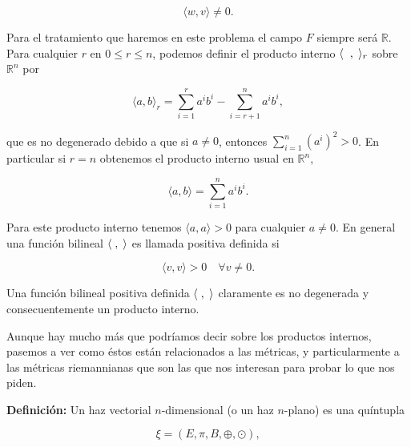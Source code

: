 \documentclass[a4paper,10pt]{article}
\numberwithin{equation}{section}
\newcommand{\definicion}{\textbf{Definición: }}
\begin{document}
\begin{equation}
 \langle w, v \rangle \ne 0.
\end{equation}

Para el tratamiento que haremos en este problema el campo $F$ siempre será $\mathbb{R}$. Para 
cualquier $r$ en $0 \leq r \leq n$, podemos definir el producto interno 
$\langle \hspace{.2cm} , \hspace{.1cm} \rangle_r$ sobre $\mathbb{R}^n$ por 

\begin{equation}
 \langle a, b \rangle_r = \sum_{i=1}^r a^ib^i - \sum_{i=r+1}^n a^ib^i,
\end{equation}

que es no degenerado debido a que si $a \ne 0$, entonces $\sum_{i=1}^n (a^i)^2 > 0$. 
En particular si $r = n$ obtenemos el producto interno usual en $\mathbb{R}^n$,

\begin{equation}
 \langle a, b \rangle = \sum_{i=1}^n a^ib^i.
\end{equation}

Para este producto interno tenemos $\langle a, a \rangle > 0$ para cualquier 
$a \ne 0$. En general una función bilineal $\langle \hspace{.1cm}, \hspace{.1cm} \rangle$ es 
llamada positiva definida si 

\begin{equation}
 \langle v, v \rangle > 0 \quad \forall v \ne 0.
\end{equation}

Una función bilineal positiva definida $\langle \hspace{.1cm}, \hspace{.1cm} \rangle$
claramente es no degenerada y consecuentemente un producto interno. 

\vspace{.3cm}

Aunque hay mucho más que podríamos decir sobre los productos internos, 
pasemos a ver como éstos están relacionados a las métricas, y particularmente 
a las métricas riemannianas que son las que nos interesan para probar lo que
nos piden. 

\vspace{.3cm}

\definicion Un haz vectorial $n$-dimensional (o un haz $n$-plano)
es una quíntupla 

\begin{equation}
 \xi = (E,\pi,B,\oplus,\odot),
\end{equation}
\end{document}
